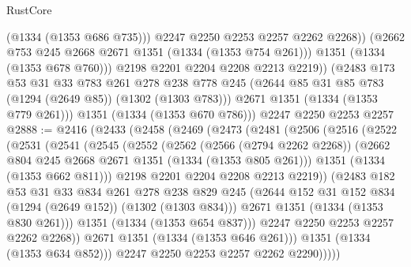 \begin{lexlean}{RustCore}
\begin{coremodule}
                  (@1334 (@1353 @686 @735)))
                @2247
                @2250
                @2253
                @2257
                @2262
                @2268))
            (@2662 @753 @245 @2668 @2671 @1351 (@1334 (@1353 @754 @261)))
            @1351
            (@1334 (@1353 @678 @760)))
          @2198
          @2201
          @2204
          @2208
          @2213
          @2219))
      (@2483
        @173
        @53
        @31
        @33
        @783
        @261
        @278
        @238
        @778
        @245
        (@2644 @85 @31 @85 @783 (@1294 (@2649 @85)) (@1302 (@1303 @783)))
        @2671
        @1351
        (@1334 (@1353 @779 @261)))
      @1351
      (@1334 (@1353 @670 @786)))
    @2247
    @2250
    @2253
    @2257
@2888 := @2416
    (@2433
      (@2458
        (@2469
          (@2473
            (@2481
              (@2506
                (@2516
                  (@2522
                    (@2531
                      (@2541
                        (@2545
                          (@2552
                            (@2562
                              (@2566 (@2794 @2262 @2268))
                              (@2662 @804 @245 @2668 @2671 @1351 (@1334 (@1353 @805 @261)))
                              @1351
                              (@1334 (@1353 @662 @811)))
                            @2198
                            @2201
                            @2204
                            @2208
                            @2213
                            @2219))
                        (@2483
                          @182
                          @53
                          @31
                          @33
                          @834
                          @261
                          @278
                          @238
                          @829
                          @245
                          (@2644 @152 @31 @152 @834 (@1294 (@2649 @152)) (@1302 (@1303 @834)))
                          @2671
                          @1351
                          (@1334 (@1353 @830 @261)))
                        @1351
                        (@1334 (@1353 @654 @837)))
                      @2247
                      @2250
                      @2253
                      @2257
                      @2262
                      @2268))
                  @2671
                  @1351
                  (@1334 (@1353 @646 @261)))
                @1351
                (@1334 (@1353 @634 @852)))
              @2247
              @2250
              @2253
              @2257
              @2262
              @2290)))))

\end{coremodule}
\end{lexlean}

